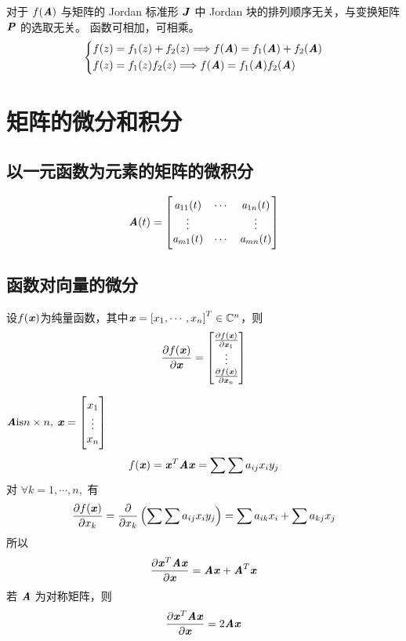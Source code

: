 \begin{theorem}
    对于 $f(\MA)$ 与矩阵的 Jordan 标准形 $\MJ$ 中 Jordan 块的排列顺序无关，与变换矩阵 $\MP$ 的选取无关。
    函数可相加，可相乘。
    \[
        \begin{dcases}
            f(z) = f_1(z) +f_2(z) \Longrightarrow f(\MA) = f_1(\MA) + f_2(\MA) \\
            f(z) = f_1(z) f_2(z) \Longrightarrow f(\MA) = f_1(\MA)  f_2(\MA)
        \end{dcases}
    \]
\end{theorem}

\section{矩阵的微分和积分}
\label{sec:矩阵的微分和积分}

\subsection{以一元函数为元素的矩阵的微积分}
\label{sub:以一元函数为元素的矩阵的微积分}

\[
    \MA(t) = \begin{bmatrix}
        \Sa_{11}(t) & \cdots    & \Sa_{1n}(t)   \\
        \vdots      &           & \vdots        \\
        \Sa_{m1}(t) & \cdots    & \Sa_{mn}(t)
    \end{bmatrix}
\]

\subsection{函数对向量的微分}
\label{sub:函数对向量的微分}

\begin{definition}
    设$f(\Vx)$为纯量函数，其中$\Vx = \left[x_1, \cdots, x_n \right]^T \in \SetC^n$，则
    \[
        \frac{\partial f(\Vx)}{\partial \Vx} =
        \begin{bmatrix}
            \frac{\partial f(\Vx)}{\partial \Vx_1} \\
            \vdots \\
            \frac{\partial f(\Vx)}{\partial \Vx_n}
        \end{bmatrix}
    \]
\end{definition}

\begin{example}
    $\ann,$ $\vxx$
    \[
        f(\Vx) = \Vx^T \MA \Vx = \sum \sum a_{ij} x_i y_j
    \]
    对 $\forall k = 1, \cdots , n,$ 有
    \[
        \frac{\partial f(\Vx)}{\partial x_k} = \frac{\partial}{\partial x_k} \left( \sum \sum a_{ij} x_i y_j \right) = \sum a_{ik}x_i + \sum a_{kj}x_j
    \]
    所以
    \[
        \frac{\partial \Vx^T \MA \Vx}{\partial \Vx} = \MA \Vx + \MA^T \Vx
    \]
    若 $\MA$ 为对称矩阵，则
    \[
        \frac{\partial \Vx^T \MA \Vx}{\partial \Vx} = 2 \MA \Vx
    \]
\end{example}



